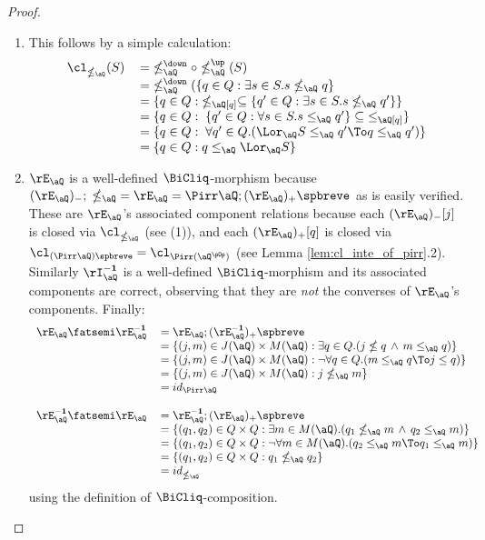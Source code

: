 \documentclass{article}
\begin{document}
\begin{proof}
\item
\begin{enumerate}
\item
This follows by a simple calculation:
\[
\begin{tabular}{lll}
$\cl_{\nleq_\aQ} (S)$
& $= \; \nleq_\aQ^\down \circ \nleq_\aQ^\up (S)$
\\&
$= \; \nleq_\aQ^\down (\{ q \in Q : \exists s \in S. s \nleq_\aQ q \}$
\\&
$= \{ q \in Q : \;\nleq_\aQ[q] \subseteq \{ q' \in Q : \exists s \in S. s \nleq_\aQ q' \} \}$
\\&
$= \{ q \in Q : \; \{ q' \in Q : \forall s \in S. s \leq_\aQ q' \} \subseteq \; \leq_\aQ[q] \}$
\\&
$= \{ q \in Q : \; \forall q' \in Q. ( \Lor_\aQ S \leq_\aQ q' \To q \leq_\aQ q' ) \}$
\\&
$= \{ q \in Q : q \leq_\aQ \Lor_\aQ S \}$
\end{tabular}
\]

\item
$\rE_\aQ$ is a well-defined $\BiCliq$-morphism because $(\rE_\aQ)_- ; \; \nleq_\aQ \; =  \rE_\aQ = \Pirr\aQ ; (\rE_\aQ)_+\spbreve$ as is easily verified. These are $\rE_\aQ$'s associated component relations because each $(\rE_\aQ)_-[j]$ is closed via $\cl_{\nleq_\aQ}$ (see (1)), and each $(\rE_\aQ)_+[q]$ is closed via $\cl_{(\Pirr\aQ)\spbreve} = \cl_{\Pirr(\aQ^{\pOp})}$ (see Lemma \ref{lem:cl_inte_of_pirr}.2). Similarly $\rI_{\aQ}^{\bf-1}$ is a well-defined $\BiCliq$-morphism and its associated components are correct, observing that they are \emph{not} the converses of $\rE_\aQ$'s components. Finally:
\[
\begin{tabular}{lll}
$\rE_\aQ \fatsemi \rE_\aQ^{\bf-1}$
&
$= \rE_\aQ ; (\rE_\aQ^{\bf-1})_+\spbreve$
\\&
$= \{ (j,m) \in J(\aQ) \times M(\aQ) : \exists q \in Q. (j \nleq q \,\land\, m \leq_\aQ q)  \}$
\\&
$= \{ (j,m) \in J(\aQ) \times M(\aQ) : \neg\forall q \in Q. (m \leq_\aQ q \To j \leq q )  \}$
\\&
$= \{ (j,m) \in J(\aQ) \times M(\aQ) : j \nleq_\aQ m \}$
\\&
$= id_{\Pirr \aQ}$  
\\
\\
$\rE_\aQ^{\bf-1} \fatsemi \rE_\aQ$
&
$= \rE_\aQ^{\bf-1} ; (\rE_\aQ)_+\spbreve$
\\&
$= \{ (q_1,q_2) \in Q \times Q : \exists m \in M(\aQ).( q_1 \nleq_\aQ m \,\land\, q_2 \leq_\aQ m  ) \}$
\\&
$= \{ (q_1,q_2) \in Q \times Q : \neg\forall m \in M(\aQ).( q_2 \leq_\aQ m \To  q_1 \leq_\aQ m  ) \}$
\\&
$= \{ (q_1,q_2) \in Q \times Q : q_1 \nleq_\aQ q_2 \}$
\\&
$= id_{\nleq_\aQ}$
\end{tabular}
\]
using the definition of $\BiCliq$-composition.

\end{enumerate}
\end{proof}
\end{document}

